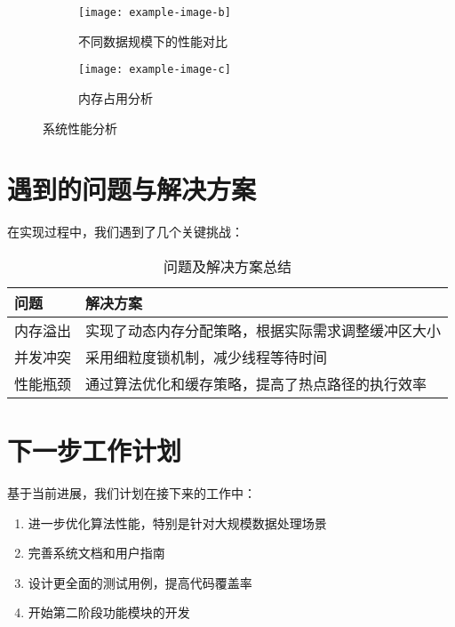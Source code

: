 \documentclass{article}
\begin{document}
\begin{figure}[h]
\centering
\begin{subfigure}{0.48\textwidth}
\centering
\texttt{[image: example-image-b]}
\caption{不同数据规模下的性能对比}
\label{fig:scale_performance}
\end{subfigure}
\hfill
\begin{subfigure}{0.48\textwidth}
\centering
\texttt{[image: example-image-c]}
\caption{内存占用分析}
\label{fig:memory_usage}
\end{subfigure}
\caption{系统性能分析}
\label{fig:performance_comparison}
\end{figure}

\section{遇到的问题与解决方案}

在实现过程中，我们遇到了几个关键挑战：

\begin{table}[h]
\centering
\begin{tabular}{|p{}|p{}|}
\hline
\textbf{问题} & \textbf{解决方案} \\
\hline
内存溢出 & 实现了动态内存分配策略，根据实际需求调整缓冲区大小 \\
\hline
并发冲突 & 采用细粒度锁机制，减少线程等待时间 \\
\hline
性能瓶颈 & 通过算法优化和缓存策略，提高了热点路径的执行效率 \\
\hline
\end{tabular}
\caption{问题及解决方案总结}
\label{tab:problems_solutions}
\end{table}

\section{下一步工作计划}

基于当前进展，我们计划在接下来的工作中：

\begin{enumerate}
\item 进一步优化算法性能，特别是针对大规模数据处理场景
\item 完善系统文档和用户指南
\item 设计更全面的测试用例，提高代码覆盖率
\item 开始第二阶段功能模块的开发 \cite{ctex2020manual}
\end{enumerate}

\end{document}
